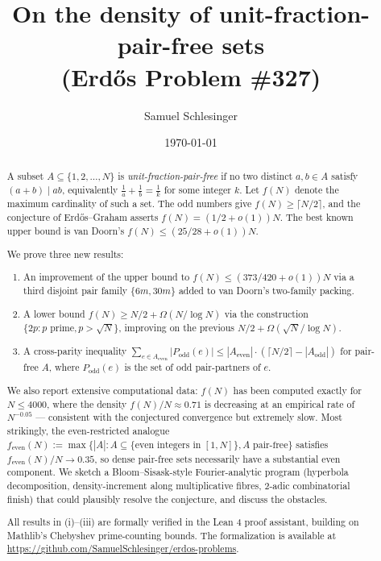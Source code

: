 \documentclass[11pt]{amsart}
\title{On the density of unit-fraction-pair-free sets\\(Erd\H{o}s Problem \#327)}
\author{Samuel Schlesinger}
\date{\today}
\theoremstyle{plain}
\theoremstyle{definition}
\begin{document}
\begin{abstract}
A subset $A \subseteq \{1, 2, \ldots, N\}$ is \emph{unit-fraction-pair-free} if no two distinct $a, b \in A$ satisfy $(a + b) \mid ab$, equivalently $\tfrac{1}{a} + \tfrac{1}{b} = \tfrac{1}{k}$ for some integer $k$. Let $f(N)$ denote the maximum cardinality of such a set. The odd numbers give $f(N) \geq \lceil N/2 \rceil$, and the conjecture of Erd\H{o}s--Graham asserts $f(N) = (1/2 + o(1))N$. The best known upper bound is van Doorn's $f(N) \leq (25/28 + o(1))N$.

We prove three new results:
\begin{enumerate}[label=(\roman*)]
  \item An improvement of the upper bound to $f(N) \leq (373/420 + o(1))N$ via a third disjoint pair family $\{6m, 30m\}$ added to van Doorn's two-family packing.
  \item A lower bound $f(N) \geq N/2 + \Omega(N / \log N)$ via the construction $\{2p : p \text{ prime}, p > \sqrt{N}\}$, improving on the previous $N/2 + \Omega(\sqrt{N}/\log N)$.
  \item A cross-parity inequality $\sum_{e \in A_{\text{even}}} |P_{\text{odd}}(e)| \leq |A_{\text{even}}| \cdot (\lceil N/2 \rceil - |A_{\text{odd}}|)$ for pair-free $A$, where $P_{\text{odd}}(e)$ is the set of odd pair-partners of $e$.
\end{enumerate}
We also report extensive computational data: $f(N)$ has been computed exactly for $N \leq 4000$, where the density $f(N)/N \approx 0.71$ is decreasing at an empirical rate of $N^{-0.05}$ --- consistent with the conjectured convergence but extremely slow. Most strikingly, the even-restricted analogue $f_{\text{even}}(N) := \max\{|A| : A \subseteq \{\text{even integers in } [1, N]\}, A \text{ pair-free}\}$ satisfies $f_{\text{even}}(N)/N \to 0.35$, so dense pair-free sets necessarily have a substantial even component. We sketch a Bloom--Sisask-style Fourier-analytic program (hyperbola decomposition, density-increment along multiplicative fibres, 2-adic combinatorial finish) that could plausibly resolve the conjecture, and discuss the obstacles.

All results in (i)--(iii) are formally verified in the Lean 4 proof assistant, building on Mathlib's Chebyshev prime-counting bounds. The formalization is available at \url{https://github.com/SamuelSchlesinger/erdos-problems}.
\end{abstract}

\maketitle
\end{document}
